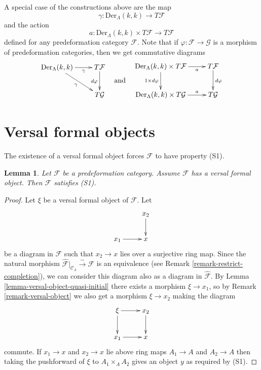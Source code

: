 \documentclass{stacks-project}
\theoremstyle{plain}
\newtheorem{lemma}[subsection]{Lemma}
\theoremstyle{definition}
\theoremstyle{remark}
\numberwithin{equation}{subsection}
\begin{document}
\noindent
A special case of the constructions above are the map
\begin{equation}
\label{equation-map}
\gamma : \text{Der}_\Lambda(k, k) \longrightarrow T\mathcal{F}
\end{equation}
and the action
\begin{equation}
\label{equation-action}
a : \text{Der}_\Lambda(k, k) \times T\mathcal{F} \longrightarrow T\mathcal{F}
\end{equation}
defined for any predeformation category $\mathcal{F}$.
Note that if $\varphi : \mathcal{F} \to \mathcal{G}$ is a morphism
of predeformation categories, then we get commutative diagrams
$$
\vcenter{
\xymatrix{
\text{Der}_\Lambda(k, k) \ar[r]_-\gamma \ar[rd]_\gamma &
T\mathcal{F} \ar[d]_{d\varphi} \\
& T\mathcal{G}
}
}
\quad\text{and}\quad
\vcenter{
\xymatrix{
\text{Der}_\Lambda(k, k) \times T\mathcal{F} \ar[r]_-a
\ar[d]_{1 \times d\varphi} &
T\mathcal{F} \ar[d]^{d\varphi} \\
\text{Der}_\Lambda(k, k) \times T\mathcal{G} \ar[r]^-a &
T\mathcal{G}
}
}
$$










\section{Versal formal objects}
\label{section-versal-objects}

\noindent
The existence of a versal formal object forces $\mathcal{F}$ to have
property (S1).

\begin{lemma}
\label{lemma-versal-object-S1}
Let $\mathcal{F}$ be a predeformation category.
Assume $\mathcal{F}$ has a versal formal object.
Then $\mathcal{F}$ satisfies (S1).
\end{lemma}

\begin{proof}
Let $\xi$ be a versal formal object of $\mathcal{F}$. Let
$$
\xymatrix{
           & x_2 \ar[d] \\
x_1 \ar[r] & x
}
$$
be a diagram in $\mathcal{F}$ such that $x_2 \to x$ lies over a
surjective ring map. Since the natural morphism
$\widehat{\mathcal{F}}|_{\mathcal{C}_\Lambda} \xrightarrow{\sim} \mathcal{F}$
is an equivalence (see
Remark \ref{remark-restrict-completion}), we can consider this
diagram also as a diagram in $\widehat{\mathcal{F}}$. By
Lemma \ref{lemma-versal-object-quasi-initial} there exists a morphism
$\xi \to x_1$, so by
Remark \ref{remark-versal-object} we also get a
morphism $\xi \to x_2$ making the diagram
$$
\xymatrix{
\xi \ar[r] \ar[d]          & x_2 \ar[d] \\
x_1 \ar[r] & x
}
$$
commute. If $x_1 \to x$ and $x_2 \to x$ lie above ring maps
$A_1 \to A$ and $A_2 \to A$ then taking the pushforward of
$\xi$ to $A_1 \times_A A_2$ gives an object $y$ as required by (S1).
\end{proof}
\end{document}
